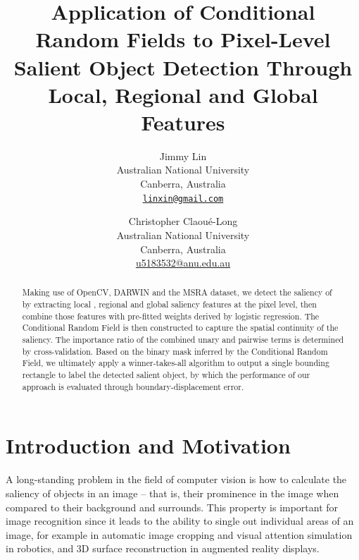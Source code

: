 \documentclass[10pt,twocolumn,letterpaper]{article}
\begin{document}
\title{Application of Conditional Random Fields to Pixel-Level Salient Object Detection Through Local, Regional and Global Features}

\author{Jimmy Lin\\
Australian National University\\
Canberra, Australia\\
{\tt\small \url{linxin@gmail.com}}
\and
Christopher Claou\'e-Long\\
Australian National University\\
Canberra, Australia\\
{\small\url{u5183532@anu.edu.au}}
}

\maketitle

\begin{abstract}
    Making use of OpenCV, DARWIN and the MSRA dataset, we detect the saliency of by extracting local
    , regional and global saliency features at the pixel level, then combine those features with pre-fitted
    weights derived by logistic regression. The Conditional Random Field is then constructed to capture
    the spatial continuity of the saliency. The importance ratio of the combined unary and pairwise terms
    is determined by cross-validation. Based on the binary mask inferred by the Conditional Random Field,
    we ultimately apply a winner-takes-all algorithm to output a single bounding rectangle to label the
    detected salient object, by which the performance of our approach is evaluated through
    boundary-displacement error. 
\end{abstract}

\section{Introduction and Motivation}
A long-standing problem in the field of computer vision is how to calculate the saliency
of objects in an image -- that is, their prominence in the image when compared to their
background and surrounds.  This property is important for image recognition since it leads
to the ability to single out individual areas of an image, for example in automatic image
cropping and visual attention simulation in robotics, and 3D surface reconstruction in 
augmented reality displays.
\end{document}
